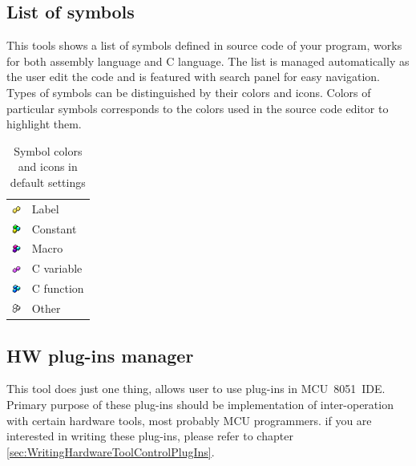\documentclass[a4paper,twoside,12pt]{book}
\newcommand{\mysmallfont}{\fontsize{8pt}{10pt} \selectfont{}}
\begin{document}
		\subsection{List of symbols}
			This tools shows a list of symbols defined in source code of your program, works for both assembly language and C language. The list is managed automatically as the user edit the code and is featured with search panel for easy navigation. Types of symbols can be distinguished by their colors and icons. Colors of particular symbols corresponds to the colors used in the source code editor to highlight them.
			\begin{table}[h]
				\mysmallfont{}
				\centering{}
				\begin{tabular}{ll}
					\includegraphics[height=8pt]{img/symbol1.png} & {\color{highlight_label} Label}		\\
					\includegraphics[height=8pt]{img/symbol3.png} & {\color{highlight_constant} Constant}	\\
					\includegraphics[height=8pt]{img/symbol2.png} & {\color{highlight_macro} Macro}		\\
					\includegraphics[height=8pt]{img/symbol4.png} & {\color{black} C variable}		\\
					\includegraphics[height=8pt]{img/symbol0.png} & {\color{blue} C function}		\\
					\includegraphics[height=8pt]{img/symbol5.png} & {\color{black} Other}			\\
				\end{tabular}
				\caption{Symbol colors and icons in default settings}
			\end{table}


		\subsection{HW plug-ins manager}
			This tool does just one thing, allows user to use plug-ins in MCU~8051~IDE. Primary purpose of these plug-ins should be implementation of inter-operation with certain hardware tools, most probably MCU programmers. if you are interested in writing these plug-ins, please refer to chapter \ref{sec:WritingHardwareToolControlPlugIns}.
\end{document}

